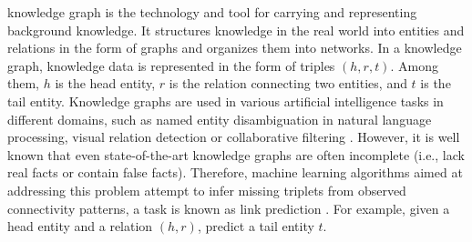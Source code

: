\documentclass[10pt,journal,compsoc]{IEEEtran}
\begin{document}
 knowledge graph is the technology and tool for carrying and representing background knowledge. It structures knowledge in the real world into entities and relations in the form of graphs and organizes them into networks. In a knowledge graph, knowledge data is represented in the form of triples $(h,r,t)$. Among them, $h$ is the head entity, $r$ is the relation connecting two entities, and $t$ is the tail entity. Knowledge graphs are used in various artificial intelligence tasks in different domains\cite{ref74}, such as named entity disambiguation \cite{ref59} in natural language processing\cite{ref75}, visual relation detection \cite{ref60} or collaborative filtering \cite{ref61}. However, it is well known that even state-of-the-art knowledge graphs are often incomplete (i.e., lack real facts or contain false facts). Therefore, machine learning algorithms aimed at addressing this problem attempt to infer missing triplets from observed connectivity patterns, a task is known as link prediction \cite{ref2}. For example, given a head entity and a relation $(h,r)$, predict a tail entity $t$. 
\end{document}
